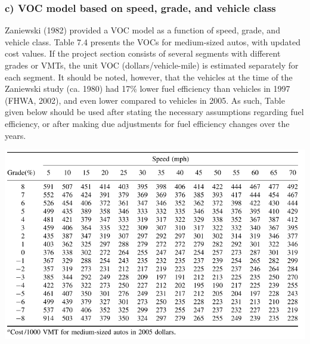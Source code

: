 \subsubsection{c) VOC model based on speed, grade, and vehicle class}
Zaniewski (1982) provided a VOC model as a function of speed, grade, and vehicle class. Table 7.4 presents the VOCs for medium-sized autos, with updated cost values. If the project section consists of several segments with different grades or VMTs, the unit VOC (dollars/vehicle-mile) is estimated separately for each segment. It should be noted, however, that the vehicles at the time of the Zaniewski study (ca. 1980) had 17\% lower fuel efficiency than vehicles in 1997 (FHWA, 2002), and even lower compared to vehicles in 2005. As such, Table given below should be used after stating the necessary assumptions regarding fuel efficiency, or after making due adjustments for fuel efficiency changes over the years.
\begin{center}
	\includegraphics[scale=0.6]{gfx/fig67.png}
\end{center}